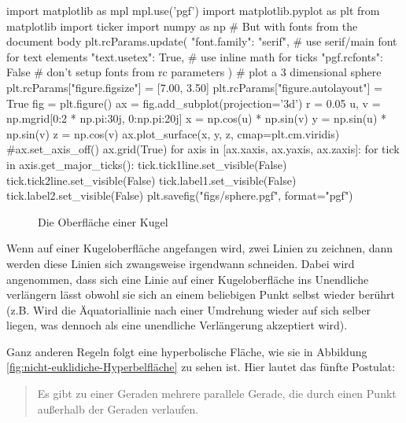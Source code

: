 \begin{pycode}
import matplotlib as mpl
mpl.use('pgf')
import matplotlib.pyplot as plt
from matplotlib import ticker
import numpy as np
# But with fonts from the document body
plt.rcParams.update({
	"font.family": "serif",  # use serif/main font for text elements
	"text.usetex": True,     # use inline math for ticks
	"pgf.rcfonts": False     # don't setup fonts from rc parameters
	})
# plot a 3 dimensional sphere
plt.rcParams["figure.figsize"] = [7.00, 3.50]
plt.rcParams["figure.autolayout"] = True
fig = plt.figure()
ax = fig.add_subplot(projection='3d')
r = 0.05
u, v = np.mgrid[0:2 * np.pi:30j, 0:np.pi:20j]
x = np.cos(u) * np.sin(v)
y = np.sin(u) * np.sin(v)
z = np.cos(v)
ax.plot_surface(x, y, z, cmap=plt.cm.viridis)
#ax.set_axis_off()
ax.grid(True)
for axis in [ax.xaxis, ax.yaxis, ax.zaxis]:
	for tick in axis.get_major_ticks():
		tick.tick1line.set_visible(False)
		tick.tick2line.set_visible(False)
		tick.label1.set_visible(False)
		tick.label2.set_visible(False)
plt.savefig("figs/sphere.pgf", format="pgf")
\end{pycode}
\begin{figure}[h]
	\centering
	\makeatletter
	\makeatother
	\caption{Die Oberfläche einer Kugel}
	\label{fig:nicht-euklidiche-Kugeloberfläche}
\end{figure}

Wenn auf einer Kugeloberfläche angefangen wird, zwei Linien zu zeichnen, dann werden diese Linien sich zwangsweise irgendwann schneiden. Dabei wird angenommen, dass sich eine Linie auf einer Kugeloberfläche ins Unendliche verlängern lässt obwohl sie sich an einem beliebigen Punkt selbst wieder berührt (z.B. Wird die Äquatoriallinie nach einer Umdrehung wieder auf sich selber liegen, was dennoch als eine unendliche Verlängerung akzeptiert wird).

Ganz anderen Regeln folgt eine hyperbolische Fläche, wie sie in Abbildung \ref{fig:nicht-euklidiche-Hyperbelfläche} zu sehen ist. Hier lautet das fünfte Postulat:
\begin{quote}
Es gibt zu einer Geraden mehrere parallele Gerade, die durch einen Punkt außerhalb der Geraden verlaufen.
\end{quote}

